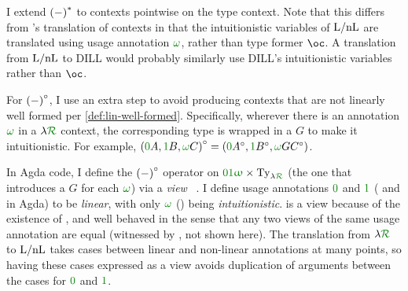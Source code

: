 I extend $\plr{-}^*$ to contexts pointwise on the type context.
Note that this differs from \citeauthor{Benton94}'s translation of contexts in
that the intuitionistic variables of $\mathrm{L/nL}$ are translated using usage
annotation $\gr\omega$, rather than type former $\oc$.
A translation from $\mathrm{L/nL}$ to DILL would probably similarly use DILL's
intuitionistic variables rather than $\oc$.

For $\plr{-}^\circ$, I use an extra step to avoid producing contexts
that are not linearly well formed per \cref{def:lin-well-formed}.
Specifically, wherever there is an annotation $\gr\omega$ in a $\name$ context,
the corresponding type is wrapped in a $G$ to make it intuitionistic.
For example, $\plr{\gr0A, \gr1B, \gr\omega C}^\circ =
\plr{\gr0A^\circ, \gr1B^\circ, \gr\omega GC^\circ}$.

In Agda code, I define the $\plr{-}^\circ$ operator on
$\oiw \times \mathrm{Ty}_{\name}$ (the one that introduces a $G$ for each
$\gr\omega$) via a \emph{view} ~\citep{MM04}.
I define usage annotations $\gr0$ and $\gr1$ ( and
 in Agda) to be \emph{linear}, with only
$\gr\omega$ (\AgdaInductiveConstructor{$\upomega$\#}) being
\emph{intuitionistic}.
 is a view because of the existence of
, and well behaved in the sense
that any two views of the same usage annotation are equal (witnessed by
, not shown here).
The translation from $\name$ to $\mathrm{L/nL}$ takes cases between linear and non-linear
annotations at many points, so having these cases expressed as a view avoids
duplication of arguments between the cases for $\gr0$ and $\gr1$.


